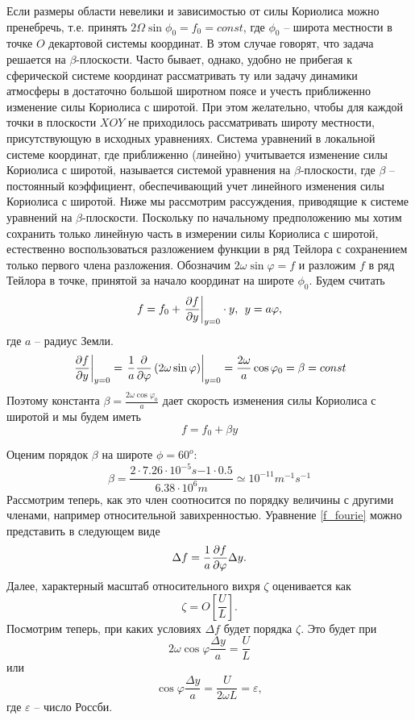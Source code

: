     Если размеры области невелики и зависимостью от силы Кориолиса можно пренебречь, т.е. принять $2\Omega \sin\phi_0=f_0=const$, где $\phi_0$ -- широта местности в точке $O$ декартовой системы координат. В этом случае говорят, что задача решается на $\beta$-плоскости.
    Часто бывает, однако, удобно не прибегая к сферической системе координат рассматривать ту или задачу динамики атмосферы в достаточно большой широтном поясе и учесть приближенно изменение силы Кориолиса с широтой. При этом желательно, чтобы для каждой точки в плоскости $XOY$ не приходилось рассматривать широту местности, присутствующую в исходных уравнениях. Система уравнений в локальной системе координат, где приближенно (линейно) учитывается изменение силы Кориолиса с широтой, называется системой уравнения на $\beta$-плоскости, где $\beta$ -- постоянный коэффициент, обеспечивающий учет линейного изменения силы Кориолиса с широтой. Ниже мы рассмотрим рассуждения, приводящие к системе уравнений на $\beta$-плоскости.
    Поскольку по начальному предположению мы хотим сохранить только линейную часть в измерении силы Кориолиса с широтой, естественно воспользоваться разложением функции в ряд Тейлора с сохранением только первого члена разложения. Обозначим $2\omega \sin\varphi =f$ и разложим $f$ в ряд Тейлора в точке, принятой за начало координат на широте $\phi_0$. Будем считать
    \begin{equation}
    \label{f_fourie}
        f = f_0 + \left. \displaystyle\frac{\partial f}{\partial y} \right|_{y=0} \cdot y, \:\: y=a\varphi,
    \end{equation} 
    где $a$ -- радиус Земли.
    \begin{equation}
        \left. \displaystyle\frac{\partial f}{\partial y} \right|_{y=0} = \left. \frac{1}{a}\frac{\partial}{\partial\varphi} \left( 2\omega \sin\varphi \right)\right|_{y=0} = \frac{2\omega}{a}\cos\varphi_0=\beta=const
    \end{equation}
    Поэтому константа $\beta=\frac{2\omega\cos\varphi_0}{a}$ дает скорость изменения силы Кориолиса с широтой и мы будем иметь  
    \begin{equation}
    \label{f_linear}
        f=f_0+\beta y    
    \end{equation}
    
    Оценим порядок $\beta$ на широте $\phi=60^o$: \\
    \[
        \beta=\frac{2 \cdot 7.26 \cdot 10^{-5}s{-1} \cdot 0.5}{6.38 \cdot 10^6 m} \simeq 10^{-11} m^{-1}s^{-1}
    \]
    Рассмотрим теперь, как это член соотносится по порядку величины с другими членами, например относительной завихренностью. Уравнение \ref{f_fourie} можно представить в следующем виде
    \begin{equation}
        \Delta f = \frac{1}{a}\displaystyle\frac{\partial f}{\partial \varphi}\Delta y.
    \end{equation}
    Далее, характерный масштаб относительного вихря $\zeta$ оценивается как
    \[ 
        \zeta = O \left[ \frac{U}{L} \right].
    \]
   Посмотрим теперь, при каких условиях $\Delta f$ будет порядка $\zeta$. Это будет при 
   \[
   2\omega\cos\varphi\frac{\Delta y}{a}=\frac{U}{L}
   \] 
   или 
   \[\cos\varphi\frac{\Delta y}{a} = \frac{U}{2\omega L}=\varepsilon,\] 
   где $\varepsilon$ -- число Россби.

